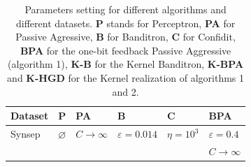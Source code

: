 \documentclass[preprint,12pt,authoryear]{elsarticle}
\begin{document}
\begin{table}[h]
	\caption{Parameters setting for different algorithms and different datasets.  {\bf P} stands for Perceptron, {\bf PA} for Passive Agressive, {\bf B} for Banditron, {\bf C} for Confidit, {\bf BPA} for the one-bit feedback Passive Aggressive (algorithm 1), {\bf K-B} for the Kernel Banditron, {\bf K-BPA} and {\bf K-HGD} for the Kernel  realization of algorithms 1 and 2.}
	\label{table:bpa}
	
	\begin{center}
		\begin{tabular}{llllll}
			
			\hline
			{\bf Dataset}  & {\bf P} & {\bf PA } & {\bf B}& {\bf C} & {\bf BPA}\\
			\hline
			Synsep & $\varnothing$ & $C\rightarrow\infty$ & $\varepsilon = 0.014$ &$\eta = 10^3$ & $\varepsilon = 0.4$\\
			&&&&& $C \rightarrow \infty$\\
			

\end{tabular}
\end{center}
\end{table}
\end{document}
